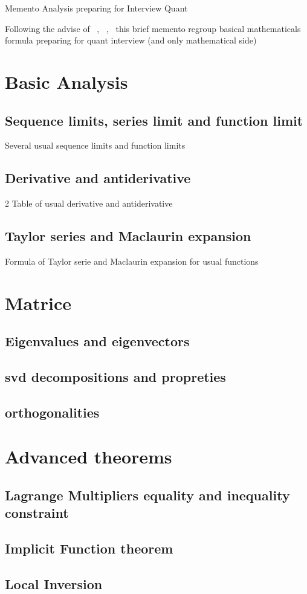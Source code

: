 \documentclass[a4paper,10pt]{article}
\begin{document}
\begin{center}Memento Analysis preparing for Interview Quant\end{center}
Following the advise of ~\cite{michael2004}, ~\cite{PDGuide},~\cite{advise} this brief memento regroup basical mathematicals formula preparing for quant interview (and only mathematical side)
\section{Basic Analysis}
\subsection{Sequence limits, series limit and function limit}
Several usual sequence limits and function limits
\subsection{Derivative and antiderivative}
2 Table of usual derivative and antiderivative
\subsection{Taylor series and Maclaurin expansion}
Formula of Taylor serie and Maclaurin expansion for usual functions
\section{Matrice}
\subsection{Eigenvalues and eigenvectors}
\subsection{svd decompositions and propreties}
\subsection{orthogonalities}
\section{Advanced theorems}
\subsection{Lagrange Multipliers equality and inequality constraint}
\subsection{Implicit Function theorem}
\subsection{Local Inversion}



\end{document}
